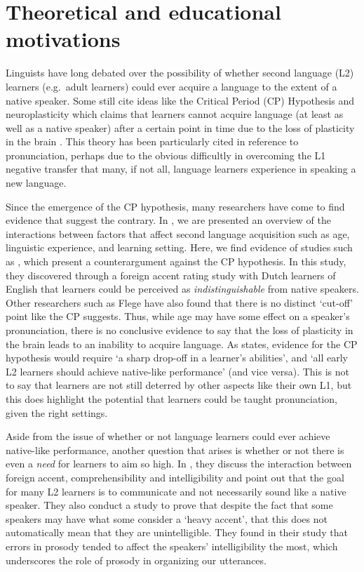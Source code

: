 \documentclass
[
    a4paper,
    twoside,
    12pt
]
{report}
\begin{document}
\section{Theoretical and educational
motivations}\label{theoretical-and-educational-motivations}

\label{sec:theo-edu} Linguists have long debated over the possibility of
whether second language (L2) learners (e.g.~adult learners) could ever
acquire a language to the extent of a native speaker. Some still cite
ideas like the Critical Period (CP) Hypothesis and neuroplasticity which
claims that learners cannot acquire language (at least as well as a
native speaker) after a certain point in time due to the loss of
plasticity in the brain \parencite{lenneberg1967,scovel1988}. This
theory has been particularly cited in reference to pronunciation,
perhaps due to the obvious difficultly in overcoming the L1 negative
transfer that many, if not all, language learners experience in speaking
a new language.

Since the emergence of the CP hypothesis, many researchers have come to
find evidence that suggest the contrary. In \textcite{lengeris2012}, we
are presented an overview of the interactions between factors that
affect second language acquisition such as age, linguistic experience,
and learning setting. Here, we find evidence of studies such as
\textcite{bongaerts1995}, which present a counterargument against the CP
hypothesis. In this study, they discovered through a foreign accent
rating study with Dutch learners of English that learners could be
perceived as \textit{indistinguishable} from native speakers. Other
researchers such as Flege have also found that there is no distinct
`cut-off' point like the CP suggests. Thus, while age may have some
effect on a speaker's pronunciation, there is no conclusive evidence to
say that the loss of plasticity in the brain leads to an inability to
acquire language. As \textcite{lengeris2012} states, evidence for the CP
hypothesis would require `a sharp drop-off in a learner's abilities',
and `all early L2 learners should achieve native-like performance' (and
vice versa). This is not to say that learners are not still deterred by
other aspects like their own L1, but this does highlight the potential
that learners could be taught pronunciation, given the right settings.

Aside from the issue of whether or not language learners could ever
achieve native-like performance, another question that arises is whether
or not there is even a \textit{need} for learners to aim so high. In
\textcite{munro1999}, they discuss the interaction between foreign
accent, comprehensibility and intelligibility and point out that the
goal for many L2 learners is to communicate and not necessarily sound
like a native speaker. They also conduct a study to prove that despite
the fact that some speakers may have what some consider a `heavy
accent', that this does not automatically mean that they are
unintelligible. They found in their study that errors in prosody tended
to affect the speakers' intelligibility the most, which underscores the
role of prosody in organizing our utterances.
\end{document}
